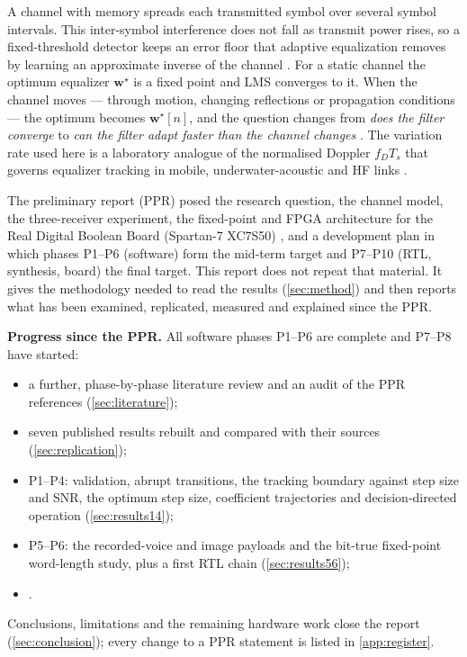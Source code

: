 A channel with memory spreads each transmitted symbol over several symbol intervals. This inter-symbol interference does not fall as transmit power rises, so a fixed-threshold detector keeps an error floor that adaptive equalization removes by learning an approximate inverse of the channel \cite{lucky1965,qureshi1985}. For a static channel the optimum equalizer $\mathbf w^\star$ is a fixed point and LMS \cite{widrowhoff1960} converges to it. When the channel moves --- through motion, changing reflections or propagation conditions --- the optimum becomes $\mathbf w^\star[n]$, and the question changes from \emph{does the filter converge} to \emph{can the filter adapt faster than the channel changes} \cite{widrow1976,macchi1995}. The variation rate used here is a laboratory analogue of the normalised Doppler $f_DT_s$ that governs equalizer tracking in mobile, underwater-acoustic and HF links \cite{jakes1974}.

The preliminary report (PPR) posed the research question, the channel model, the three-receiver experiment, the fixed-point and FPGA architecture for the Real Digital Boolean Board (Spartan-7 XC7S50) \cite{realdigitalboard}, and a development plan in which phases P1--P6 (software) form the mid-term target and P7--P10 (RTL, synthesis, board) the final target. This report does not repeat that material. It gives the methodology needed to read the results (\cref{sec:method}) and then reports what has been examined, replicated, measured and explained since the PPR.

\noindent\textbf{Progress since the PPR.} All software phases P1--P6 are complete and P7--P8 have started:
\begin{itemize}\itemsep0pt
\item a further, phase-by-phase literature review and an audit of the PPR references (\cref{sec:literature});
\item seven published results rebuilt and compared with their sources (\cref{sec:replication});
\item P1--P4: validation, abrupt transitions, the tracking boundary against step size and SNR, the optimum step size, coefficient trajectories and decision-directed operation (\cref{sec:results14});
\item P5--P6: the recorded-voice and image payloads and the bit-true fixed-point word-length study, plus a first RTL chain (\cref{sec:results56});
\item {}.
\end{itemize}
Conclusions, limitations and the remaining hardware work close the report (\cref{sec:conclusion}); every change to a PPR statement is listed in \cref{app:register}.

